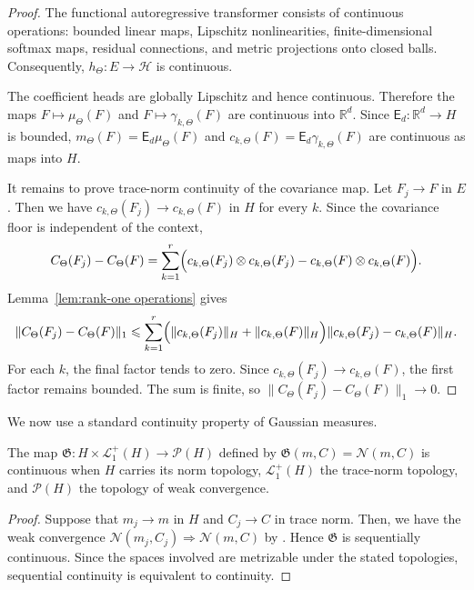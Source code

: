 \begin{proof}
The functional autoregressive transformer consists of continuous operations: bounded linear maps, Lipschitz nonlinearities, finite-dimensional softmax maps, residual connections, and metric projections onto closed balls. Consequently, \(h_\Theta:E\to\mathcal H\) is continuous.

The coefficient heads are globally Lipschitz and hence continuous. Therefore the maps \(F\mapsto\mu_\Theta(F)\) and \(F\mapsto\gamma_{k,\Theta}(F)\) are continuous into \(\mathbb R^d\). Since \(\mathsf E_d:\mathbb R^d\to H\) is bounded, \(m_\Theta(F)=\mathsf E_d\mu_\Theta(F)\) and \(c_{k,\Theta}(F)=\mathsf E_d\gamma_{k,\Theta}(F)\) are continuous as maps into \(H\).

It remains to prove trace-norm continuity of the covariance map. Let \(F_j\to F\) in \(E\). Then we have \(c_{k,\Theta}(F_j)\to c_{k,\Theta}(F)\) in \(H\) for every \(k\). Since the covariance floor is independent of the context,
\[
\begin{aligned}
C_\Theta(F_j)-C_\Theta(F)
=
\sum_{k=1}^r
\Bigl(
c_{k,\Theta}(F_j)\otimes c_{k,\Theta}(F_j)
-
c_{k,\Theta}(F)\otimes c_{k,\Theta}(F)
\Bigr).
\end{aligned}
\]
Lemma~\ref{lem:rank-one operations} gives
\[
\|C_\Theta(F_j)-C_\Theta(F)\|_1
\leqslant
\sum_{k=1}^r
\Bigl(
\|c_{k,\Theta}(F_j)\|_H
+
\|c_{k,\Theta}(F)\|_H
\Bigr)
\|c_{k,\Theta}(F_j)-c_{k,\Theta}(F)\|_H.
\]
For each \(k\), the final factor tends to zero. Since \(c_{k,\Theta}(F_j)\to c_{k,\Theta}(F)\), the first factor remains bounded. The sum is finite, so \(\|C_\Theta(F_j)-C_\Theta(F)\|_1\to0\).
\end{proof}

We now use a standard continuity property of Gaussian measures.

\begin{proposition}
\label{prop:Continuity of the Gaussian parameter map}
The map
\(
\mathfrak G:
H\times\mathcal L_1^+(H)
\to
\mathcal P(H)\)
defined by \(
\mathfrak G(m,C)
=
\mathcal N(m,C)
\)
is continuous when \(H\) carries its norm topology, \(\mathcal L_1^+(H)\) the trace-norm topology, and \(\mathcal P(H)\) the topology of weak convergence.
\end{proposition}

\begin{proof}
Suppose that \(m_j\to m\) in \(H\) and \(C_j\to C\) in trace norm. Then, we have the weak convergence
\(
\mathcal N(m_j,C_j)
\Rightarrow
\mathcal N(m,C)
\)
by \cite[Theorem~2.7.21]{Bogachev2018}. Hence \(\mathfrak G\) is sequentially continuous. Since the spaces involved are metrizable under the stated topologies, sequential continuity is equivalent to continuity.
\end{proof}


